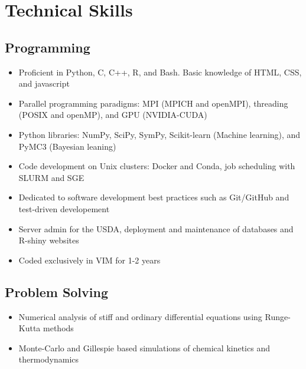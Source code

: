 


\vspace{-10pt}
\section{Technical Skills}
\vspace{-15pt}
\begin{multicols}{2}
\subsection{Programming}
\begin{itemize}
\item{Proficient in Python, C, C++, R, and Bash. Basic knowledge of HTML, CSS, and javascript}
\item{Parallel programming paradigms: MPI (MPICH and openMPI), threading (POSIX and openMP), and GPU (NVIDIA-CUDA)}
\item{Python libraries: NumPy, SciPy, SymPy, Scikit-learn (Machine learning), and PyMC3 (Bayesian leaning)}
\item{Code development on Unix clusters: Docker and Conda, job scheduling with SLURM and SGE}
\item{Dedicated to software development best practices such as Git/GitHub and test-driven developement}
\item{Server admin for the USDA, deployment and maintenance of databases and R-shiny websites}
\item{Coded exclusively in VIM for 1-2 years}
\end{itemize}

\subsection{Problem Solving}
\begin{itemize}
\item{Numerical analysis of stiff and ordinary differential equations using Runge-Kutta methods}
\item{Monte-Carlo and Gillespie based simulations of chemical kinetics and thermodynamics}
\end{itemize}


\end{multicols}
